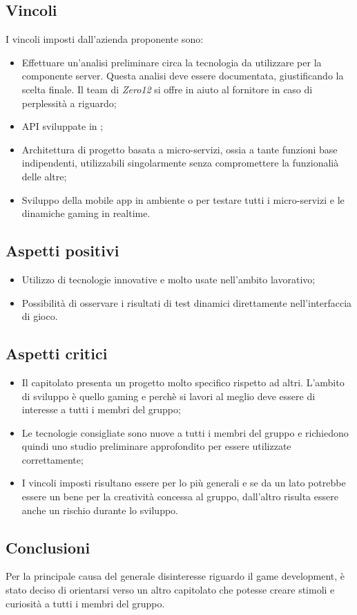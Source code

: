 \subsection{Vincoli}
I vincoli imposti dall'azienda proponente sono:
\begin{itemize}
\item Effettuare un'analisi preliminare circa la tecnologia da utilizzare per la componente server. Questa analisi deve essere documentata, giustificando la scelta finale. Il team di \textit{Zero12} si offre in aiuto al fornitore in caso di perplessità a riguardo;
\item API sviluppate in ;
\item Architettura di progetto basata a micro-servizi, ossia a tante funzioni base indipendenti, utilizzabili singolarmente senza compromettere la funzionalià delle altre;
\item Sviluppo della mobile app in ambiente  o  per testare tutti i micro-servizi e le dinamiche gaming in realtime. 
\end{itemize}

\subsection{Aspetti positivi}
\begin{itemize}
\item Utilizzo di tecnologie innovative e molto usate nell'ambito lavorativo;
\item Possibilità di osservare i risultati di test dinamici direttamente nell'interfaccia di gioco.
\end{itemize}

\subsection{Aspetti critici}
\begin{itemize}
\item Il capitolato presenta un progetto molto specifico rispetto ad altri. L'ambito di sviluppo è quello gaming e perchè si lavori al meglio deve essere di interesse a tutti i membri del gruppo;
\item Le tecnologie consigliate sono nuove a tutti i membri del gruppo e richiedono quindi uno studio preliminare approfondito per essere utilizzate correttamente;
\item I vincoli imposti risultano essere per lo più generali e se da un lato potrebbe essere un bene per la creatività concessa al gruppo, dall'altro risulta essere anche un rischio durante lo sviluppo. 
\end{itemize}

\subsection{Conclusioni}
Per la principale causa del generale disinteresse riguardo il game development, è stato deciso di orientarsi verso un altro capitolato che potesse creare stimoli e curiosità a tutti i membri del gruppo.
